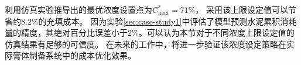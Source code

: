 
利用仿真实验推导出的最优浓度设置点为$C^*_{\max}=71\%$，
采用该上限设定值可以节省约8.2\%的充填成本。
因为实验\ref{sec:case-study1}中评估了模型预测水泥累积消耗量的精度，其绝对百分比误差小于2\%。可以认为本节对于不同浓度上限设定值的仿真结果有足够的可信度。
在未来的工作中，将进一步验证该浓度设定策略在实际膏体制备系统中的成本优化效果。








